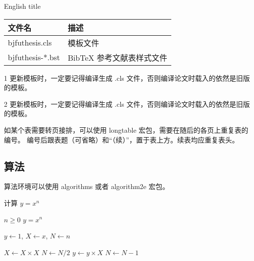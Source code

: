\begin{table}[h]
	\xiaowu
	\centering
	\begin{threeparttable}[c]
		 {English title}
		\label{tab:three-part-table}
		\begin{tabular}{ll}
			\toprule
			文件名                     & 描述                      \\
			\midrule
			bjfuthesis.cls\tnote{1}    & 模板文件                  \\
			bjfuthesis-*.bst \tnote{2} & BibTeX 参考文献表样式文件 \\
			\bottomrule
		\end{tabular}
		\begin{tablenotes}

			\item [1] 更新模板时，一定要记得编译生成 .cls 文件，否则编译论文时载入的依然是旧版的模板。
			\item [2] 更新模板时，一定要记得编译生成 .cls 文件，否则编译论文时载入的依然是旧版的模板。
		\end{tablenotes}
	\end{threeparttable}
\end{table}

如某个表需要转页接排，可以使用 longtable 宏包，需要在随后的各页上重复表的编号。
编号后跟表题（可省略）和“（续）”，置于表上方。续表均应重复表头。


\subsection{算法}

算法环境可以使用 algorithms 或者 algorithm2e 宏包。
\renewcommand{\algorithmicrequire}{\textbf{输入：}\unskip}
\renewcommand{\algorithmicensure}{\textbf{输出：}\unskip}

\begin{algorithm}[ht]
	\caption{计算 $y = x^n$}
	\label{alg1}
	\small
	\begin{algorithmic}
		\REQUIRE $n \geq 0$
		\ENSURE $y = x^n$

		\STATE $y \leftarrow 1$, $X \leftarrow x$, $N \leftarrow n$

		\STATE $X \leftarrow X \times X$
		\STATE $N \leftarrow N / 2$
		\ELSE[$N$ is odd]
		\STATE $y \leftarrow y \times X$
		\STATE $N \leftarrow N - 1$
		\ENDIF
		\ENDWHILE
	\end{algorithmic}
\end{algorithm}
